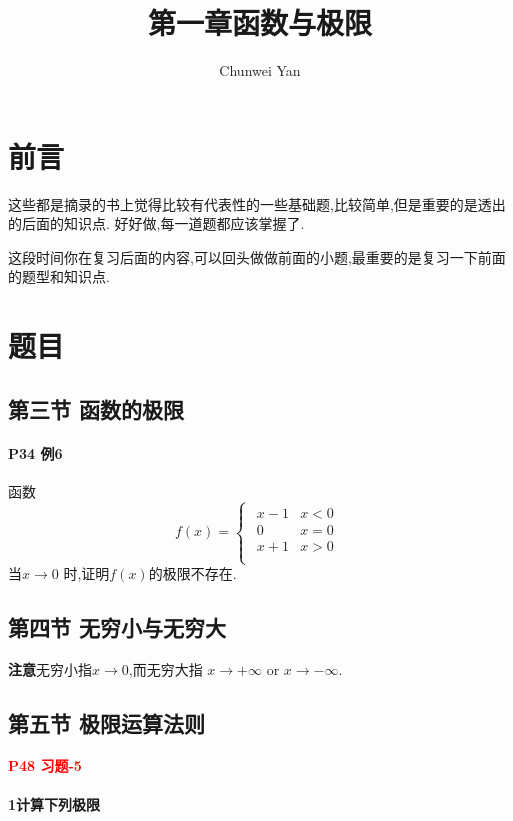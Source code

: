 \documentclass[a4paper]{article}
\author{Chunwei Yan}
\title{第一章\quad 函数与极限}
\begin{document}
\large
    \maketitle

\section{前言}
这些都是摘录的书上觉得比较有代表性的一些基础题,比较简单,但是重要的是透出的后面的知识点. 
好好做,每一道题都应该掌握了.

这段时间你在复习后面的内容,可以回头做做前面的小题,最重要的是复习一下前面的题型和知识点.

\section{题目}

\subsection{第三节 \quad 函数的极限}
\paragraph{P34 \quad 例6}
函数
$$
f(x)=
\begin{cases}
\begin{array}{ll}
x-1 &   x<0\\
0   &   x=0\\
x+1 &   x>0\\
\end{array}
\end{cases}
$$
当$x\rightarrow 0$ 时,证明$f(x)$的极限不存在.

\subsection{第四节 \quad 无穷小与无穷大}
\textbf{注意}无穷小指$x \rightarrow 0$,而无穷大指
            $x \rightarrow +\infty$ or $x \rightarrow -\infty$.

\subsection{第五节 \quad 极限运算法则}

\textcolor{red}{\textbf{P48 \quad 习题-5}}
\paragraph{1\quad 计算下列极限}
\end{document}
